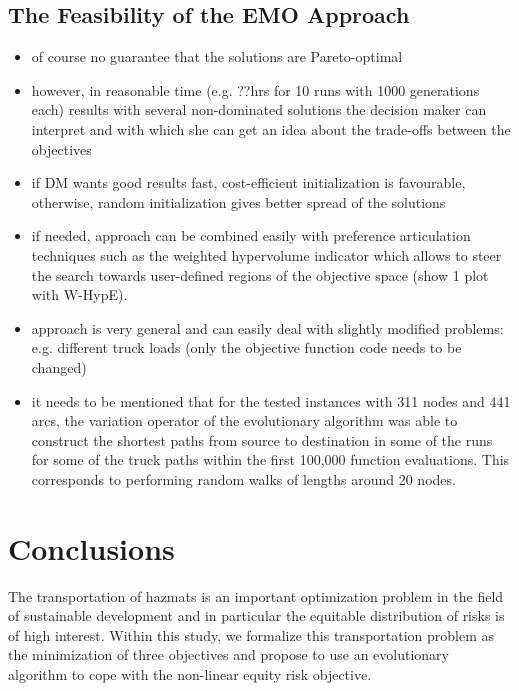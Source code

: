 \documentclass[preprint,12pt]{elsarticle}
\begin{document}
\subsection{The Feasibility of the EMO Approach}
\begin{itemize}
	\item of course no guarantee that the solutions are Pareto-optimal
	\item however, in reasonable time (e.g. ??hrs for 10 runs with 1000 generations each) results with several non-dominated solutions the decision maker can interpret and with which she can get an idea about the trade-offs between the objectives
	\item if DM wants good results fast, cost-efficient initialization is favourable, otherwise, random initialization gives better spread of the solutions
	\item if needed, approach can be combined easily with preference articulation techniques such as the weighted hypervolume indicator which allows to steer the search towards user-defined regions of the objective space (show 1 plot with W-HypE).
	\item approach is very general and can easily deal with slightly modified problems: e.g. different truck loads (only the objective function code needs to be changed)
	\item it needs to be mentioned that for the tested instances with 311 nodes and 441 arcs, the variation operator of the evolutionary algorithm was able to construct the shortest paths from source to destination in some of the runs for some of the truck paths within the first 100,000 function evaluations. This corresponds to performing random walks of lengths around 20 nodes.
\end{itemize}


\section{Conclusions} \label{S_FW}
The transportation of hazmats is an important optimization problem in the field of sustainable development and in particular the equitable distribution of risks is of high interest. Within this study, we formalize this transportation problem as the minimization of three objectives and propose to use an evolutionary algorithm to cope with the non-linear equity risk objective.
\end{document}
